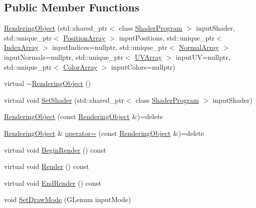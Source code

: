 \subsection*{Public Member Functions}
\begin{DoxyCompactItemize}
\item 
\hyperlink{class_rendering_object_a0550d86d49a01032921150d1c09c378f}{Rendering\+Object} (std\+::shared\+\_\+ptr$<$ class \hyperlink{class_shader_program}{Shader\+Program} $>$ input\+Shader, std\+::unique\+\_\+ptr$<$ \hyperlink{class_rendering_object_a1223b9cf03f2029b9c43d71042c2a18e}{Position\+Array} $>$ input\+Positions, std\+::unique\+\_\+ptr$<$ \hyperlink{class_rendering_object_a9931c88bca3384065c6691dfe1e60af1}{Index\+Array} $>$ input\+Indices=nullptr, std\+::unique\+\_\+ptr$<$ \hyperlink{class_rendering_object_a327c4d892de8d6138fb59afa6d078257}{Normal\+Array} $>$ input\+Normals=nullptr, std\+::unique\+\_\+ptr$<$ \hyperlink{class_rendering_object_a504ecd45ebe36dfa5b78c46d64d9904a}{U\+V\+Array} $>$ input\+U\+V=nullptr, std\+::unique\+\_\+ptr$<$ \hyperlink{class_rendering_object_a8a12e1f9be788d99af6c089e1c600022}{Color\+Array} $>$ input\+Colors=nullptr)
\item 
virtual \hyperlink{class_rendering_object_ae4e8e14104ee3a587d10c9f90ec82048}{$\sim$\+Rendering\+Object} ()
\item 
virtual void \hyperlink{class_rendering_object_a22311d08bb7559f6b913afe314a5031e}{Set\+Shader} (std\+::shared\+\_\+ptr$<$ class \hyperlink{class_shader_program}{Shader\+Program} $>$ input\+Shader)
\item 
\hyperlink{class_rendering_object_ac702ac667116929234273ecdb99cf7d6}{Rendering\+Object} (const \hyperlink{class_rendering_object}{Rendering\+Object} \&)=delete
\item 
\hyperlink{class_rendering_object}{Rendering\+Object} \& \hyperlink{class_rendering_object_ab644292ac584d1a9813e5f30ad79c4f1}{operator=} (const \hyperlink{class_rendering_object}{Rendering\+Object} \&)=delete
\item 
virtual void \hyperlink{class_rendering_object_afa4510ba81fb7b17b940c92b27442d93}{Begin\+Render} () const 
\item 
virtual void \hyperlink{class_rendering_object_a5fdb7a1b2d53b7ce024a4eeabd9c86d3}{Render} () const 
\item 
virtual void \hyperlink{class_rendering_object_a2a038472f934360acddd26f4e992b28b}{End\+Render} () const 
\item 
void \hyperlink{class_rendering_object_aa627eb310f11d0e04dbbb3665f58bb4e}{Set\+Draw\+Mode} (G\+Lenum input\+Mode)

\end{DoxyCompactItemize}
